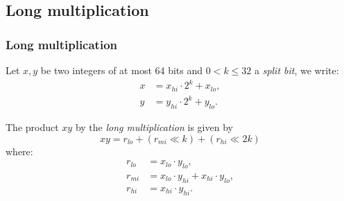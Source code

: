 \documentclass[10pt]{beamer}
\begin{document}
\subsection{Long multiplication}
\begin{frame}
    \frametitle{Long multiplication}
    Let $x,y$ be two integers of at most 64 bits and $0 < k \leq 32$ a \textit{split bit}, we write:
    \begin{align*}
        x &= x_{hi} \cdot 2^k + x_{lo}, \\
        y &= y_{hi} \cdot 2^k + y_{lo}.
    \end{align*}

    \pause
    \begin{mybox}
        The product $xy$ by the \textit{long multiplication} is given by
        $$xy = r_{lo} + (r_{mi} \ll k) + (r_{hi} \ll 2k)$$
        where:
        \begin{align*}
            r_{lo} &= x_{lo} \cdot y_{lo}, \\
            r_{mi} &= x_{lo} \cdot y_{hi} + x_{hi} \cdot y_{lo}, \\
            r_{hi} &= x_{hi} \cdot y_{hi}. 
        \end{align*}
    \end{mybox}
\end{frame}
\end{document}
